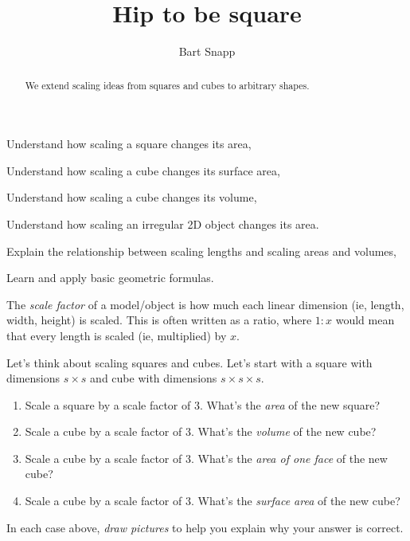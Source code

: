 \documentclass[handout,nooutcomes,noauthor,hints]{../ximera}
\title{Hip to be square}
\author{Bart Snapp}
\begin{document}
\begin{abstract}
  We extend scaling ideas from squares and cubes to arbitrary shapes.
\end{abstract}
\maketitle

\begin{listOutcomes}
\item Understand how scaling a square changes its area,
\item Understand how scaling a cube changes its surface area,
\item Understand how scaling a cube changes its volume,
\item Understand how scaling an irregular 2D object changes its area.
\end{listOutcomes}

\begin{listObjectives}
 \item Explain the relationship between scaling lengths and scaling areas and volumes,
\item Learn and apply basic geometric formulas.
\end{listObjectives}



\begin{definition}
 The \emph{scale factor} of a model/object is how much each linear dimension (ie, length, width, height) is scaled. This is often written as a ratio, where $1:x$ would mean that every length is scaled (ie, multiplied) by $x$. \end{definition}

\mynewpage

\begin{question}
  Let's think about scaling squares and cubes. Let's start with a square with dimensions $s\times s$ and cube with dimensions $s\times s\times s$.
  \begin{enumerate}
  \item Scale a square by a scale factor of $3$. What's the \emph{area} of the new square? 
  \item Scale a cube by a scale factor of $3$. What's the \emph{volume} of the new cube?
  \item Scale a cube by a scale factor of $3$. What's the \emph{area of one face} of the new cube?
  \item Scale a cube by a scale factor of $3$. What's the \emph{surface area} of the new cube?
  \end{enumerate}
  In each case above, \emph{draw pictures} to help you explain why your
  answer is correct.
\end{question}
\mynewpage
\end{document}
